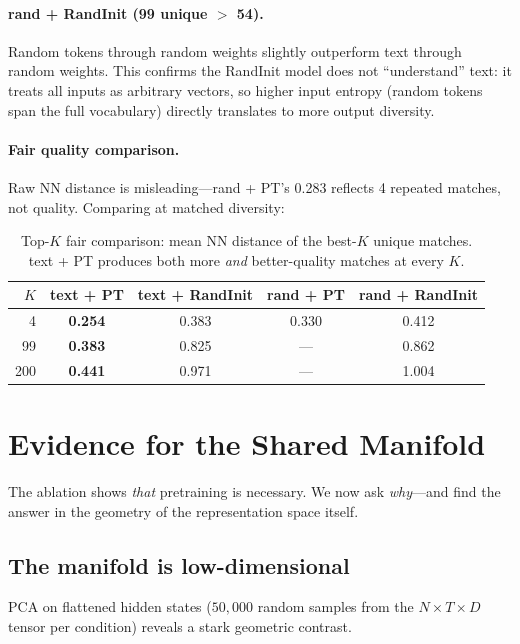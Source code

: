 \documentclass[11pt,a4paper]{article}
\begin{document}
\paragraph{rand + RandInit (99 unique $>$ 54).} Random tokens through random weights slightly outperform text through random weights. This confirms the RandInit model does not ``understand'' text: it treats all inputs as arbitrary vectors, so higher input entropy (random tokens span the full vocabulary) directly translates to more output diversity.

\paragraph{Fair quality comparison.} Raw NN distance is misleading---rand + PT's 0.283 reflects 4 repeated matches, not quality. Comparing at matched diversity:

\begin{table}[h]
\centering
\begin{tabular}{rcccc}
\toprule
$K$ & text + PT & text + RandInit & rand + PT & rand + RandInit \\
\midrule
4 & \textbf{0.254} & 0.383 & 0.330 & 0.412 \\
99 & \textbf{0.383} & 0.825 & --- & 0.862 \\
200 & \textbf{0.441} & 0.971 & --- & 1.004 \\
\bottomrule
\end{tabular}
\caption{Top-$K$ fair comparison: mean NN distance of the best-$K$ unique matches. text + PT produces both more \textit{and} better-quality matches at every $K$.}
\label{tab:topk}
\end{table}

\section{Evidence for the Shared Manifold}

The ablation shows \textit{that} pretraining is necessary. We now ask \textit{why}---and find the answer in the geometry of the representation space itself.

\subsection{The manifold is low-dimensional}

PCA on flattened hidden states ($50{,}000$ random samples from the $N{\times}T{\times}D$ tensor per condition) reveals a stark geometric contrast.
\end{document}
